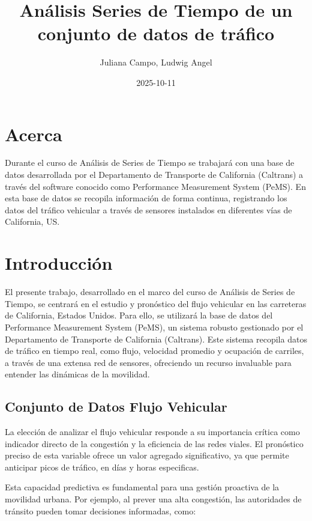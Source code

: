 \documentclass[
]{book}
\title{Análisis Series de Tiempo de un conjunto de datos de tráfico}
\author{Juliana Campo, Ludwig Angel}
\date{2025-10-11}
\begin{document}
\maketitle

{
\setcounter{tocdepth}{1}
\tableofcontents
}
\chapter{Acerca}\label{acerca}

Durante el curso de Análisis de Series de Tiempo se trabajará con una base de datos desarrollada por el Departamento de Transporte de California (Caltrans) a través del software conocido como Performance Measurement System (PeMS). En esta base de datos se recopila información de forma continua, registrando los datos del tráfico vehicular a través de sensores instalados en diferentes vías de California, US.

\chapter{Introducción}\label{introducciuxf3n}

El presente trabajo, desarrollado en el marco del curso de Análisis de Series de Tiempo, se centrará en el estudio y pronóstico del flujo vehicular en las carreteras de California, Estados Unidos. Para ello, se utilizará la base de datos del Performance Measurement System (PeMS), un sistema robusto gestionado por el Departamento de Transporte de California (Caltrans). Este sistema recopila datos de tráfico en tiempo real, como flujo, velocidad promedio y ocupación de carriles, a través de una extensa red de sensores, ofreciendo un recurso invaluable para entender las dinámicas de la movilidad.

\section{Conjunto de Datos Flujo Vehicular}\label{conjunto-de-datos-flujo-vehicular}

La elección de analizar el flujo vehicular responde a su importancia crítica como indicador directo de la congestión y la eficiencia de las redes viales. El pronóstico preciso de esta variable ofrece un valor agregado significativo, ya que permite anticipar picos de tráfico, en días y horas especificas.

Esta capacidad predictiva es fundamental para una gestión proactiva de la movilidad urbana. Por ejemplo, al prever una alta congestión, las autoridades de tránsito pueden tomar decisiones informadas, como:
\end{document}
